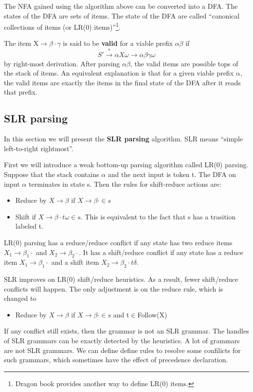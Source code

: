 The NFA gained using the algorithm above can be converted into a DFA. The states of the DFA are sets of items. The state of the DFA are called ``canonical collections of items (or LR(0) items)''\footnote{Dragon book provides another way to define LR(0) items.}.

The item X$\rightarrow\beta\cdot\gamma$ is said to be \textbf{valid} for a viable prefix $\alpha\beta$ if
\begin{equation*}
S' \xrightarrow{*}\alpha X\omega\rightarrow\alpha\beta\gamma\omega
\end{equation*}
by right-most derivation. After parsing $\alpha\beta$, the valid items are possible tops of the stack of items. An equivalent explanation is that for a given viable prefix $\alpha$, the valid items are exactly the items in the final state of the DFA after it reads that prefix.
\subsection{SLR parsing}
In this section we will present the {\bf SLR parsing} algorithm. SLR means ``simple left-to-right rightmost''.

First we will introduce a weak bottom-up parsing algorithm called LR(0) parsing. Suppose that the stack contains $\alpha$ and the next input is token t. The DFA on input $\alpha$ terminates in state s. Then the rules for shift-reduce actions are:
\begin{itemize}
\item Reduce by $X\rightarrow\beta$ if $X\rightarrow\beta\cdot\in s$
\item Shift if $X\rightarrow\beta\cdot t\omega\in s$. This is equivalent to the fact that s has a trasition labeled t.
\end{itemize}
LR(0) parsing has a reduce/reduce conflict if any state has two reduce items $X_1\rightarrow\beta_1\cdot$ and $X_2\rightarrow\beta_2\cdot$. It has a shift/reduce conflict if any state has a reduce item $X_1\rightarrow\beta_1\cdot$ and a shift item $X_2\rightarrow\beta_2\cdot t\delta$.

SLR improves on LR(0) shift/reduce heuristics. As a result, fewer shift/reduce conflicts will happen. The only adjustment is on the reduce rule, which is changed to 
\begin{itemize}
\item Reduce by $X\rightarrow\beta$ if $X\rightarrow\beta\cdot\in s$ and t$\in$Follow(X)
\end{itemize}
If any conflict still exists, then the grammar is not an SLR grammar. The handles of SLR grammars can be exactly detected by the heuristics. A lot of grammars are not SLR grammars. We can define define rules to resolve some confilicts for such grammars, which sometimes have the effect of precedence declaration.

